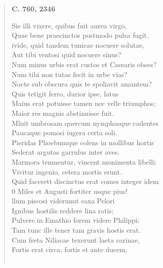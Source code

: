 \documentclass[11pt, a4paper]{report}
\begin{document}
\begin{verse}
     \marginpar{[00]} \begin{center} \textbf{C. 760, 2346} \end{center}Sie illi vixere, quibus fuit aurea virgo, \\ Quae bene praecinctos postmodo pulsa fugit. \\ ivide, quid tandem tunicae nocuere solutae, \\ Aut tibi ventosi quid nocuere sinus? \\ Num minus urbis erat custos et Caesaris obses? \\ Num tibi non tutas fecit in urbe vias? \\ Nocte sub obscura quis te spoliavit amantem? \\ Quis tetigit ferro, durior ipse, latus \\ Maius erat potuisse tamen nec velle triumphos; \\ Maior res magnis abstinuisse fuit. \\ Mluit umbrosam quercum nymphasque cadentes \\ Paucaque pomosi iugera certa soli. \\ Pieridas Phoebumque colens in mollibus hortis \\ Sederat argutas garrulus inter aves. \\ Marmora temnentur, vincent monimenta libelli: \\ Vivitur ingenio, cetera mortis erunt. \\ Quid facerett discinctus erat comes integer idem \\ 0 Miles et Augusti fortiter usque pius! \\ llum piscosi viderunut saxa Pelori \\ Ignibus hostilis reddere lina ratis; \\ Pulvere in Emathio forem videre Philippi: \\ Tam tunc ille tener tam gravis hostis erat. \\ Cum freta Niliacae texerunt laeta carinae, \\ Fortis erat circa, fortis et ante ducem, \\ 
        ﻿\pagebreak 

\end{verse}
\end{document}
